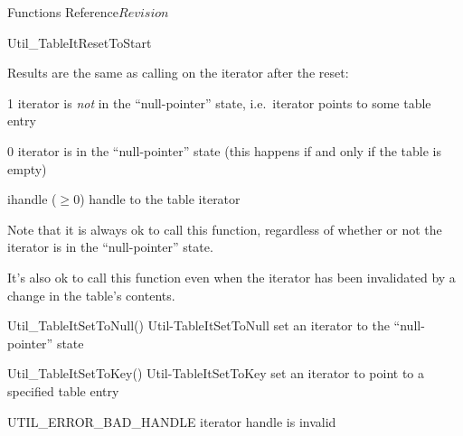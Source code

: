 \begin{cactuspart}{ Functions Reference}{}{$Revision$}
\begin{FunctionDescription}{Util\_TableItResetToStart}
\begin{ResultSection}
\begin{ResultNote}
Results are the same as calling 
on the iterator after the reset:
\end{ResultNote}
\begin{Result}{\rm 1}
iterator is {\em not\/} in the ``null-pointer'' state,
i.e.\ iterator points to some table entry
\end{Result}
\begin{Result}{\rm 0}
iterator is in the ``null-pointer'' state
(this happens if and only if the table is empty)
\end{Result}
\end{ResultSection}

\begin{ParameterSection}
\begin{Parameter}{ihandle ($\ge 0$)}
handle to the table iterator
\end{Parameter}
\end{ParameterSection}

\begin{Discussion}
Note that it is always ok to call this function, regardless of
whether or not the iterator is in the ``null-pointer'' state.

It's also ok to call this function even when the iterator has been
invalidated by a change in the table's contents.
\end{Discussion}

\begin{SeeAlsoSection}
\begin{SeeAlso2} {Util\_TableItSetToNull()} {Util-TableItSetToNull}
set an iterator to the ``null-pointer'' state
\end{SeeAlso2}
\begin{SeeAlso2} {Util\_TableItSetToKey()} {Util-TableItSetToKey}
set an iterator to point to a specified table entry
\end{SeeAlso2}
\end{SeeAlsoSection}

\begin{ErrorSection}
\begin{Error}{UTIL\_ERROR\_BAD\_HANDLE}
iterator handle is invalid
\end{Error}
\end{ErrorSection}
\end{FunctionDescription}



\end{cactuspart}
